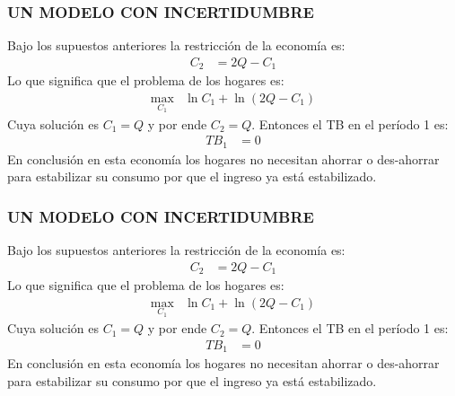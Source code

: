 \documentclass[10pt, xcolor=table, x11names]{beamer}
\begin{document}
\begin{frame}[label=3]
	\frametitle{{\normalsize  UN MODELO CON INCERTIDUMBRE} {}}
	Bajo los supuestos anteriores la restricción de la economía es:
	\begin{align}
	C_{2}&=2Q-C_{1}
	\end{align}
	Lo que significa que el problema de los hogares es:
	\begin{align}
	\max_{C_{1}}& \ln{C_{1}}+ \ln{(2Q-C_{1})}\nonumber 
	 \end{align}
	 Cuya solución es $C_{1}=Q$	y por ende $C_{2}=Q $. Entonces el TB en el período 1 es:
	 \begin{align}
	 TB_{1}&=0
	 \end{align}
	 En conclusión en esta economía los hogares no necesitan ahorrar o des-ahorrar para estabilizar su consumo por que el ingreso ya está estabilizado.	
\end{frame}

\begin{frame}[label=4]
	\frametitle{{\normalsize  UN MODELO CON INCERTIDUMBRE} {}}
	Bajo los supuestos anteriores la restricción de la economía es:
	\begin{align}
	C_{2}&=2Q-C_{1}
	\end{align}
	Lo que significa que el problema de los hogares es:
	\begin{align}
	\max_{C_{1}}& \ln{C_{1}}+ \ln{(2Q-C_{1})}\nonumber 
	\end{align}
	Cuya solución es $C_{1}=Q$	y por ende $C_{2}=Q $. Entonces el TB en el período 1 es:
	\begin{align}
	TB_{1}&=0
	\end{align}
	En conclusión en esta economía los hogares no necesitan ahorrar o des-ahorrar para estabilizar su consumo por que el ingreso ya está estabilizado.	
\end{frame}
\end{document}
